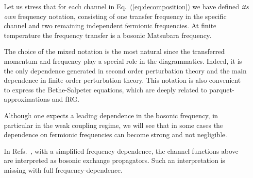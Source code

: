 Let us stress that for each channel in Eq.~(\ref{eq:decomposition}) we have defined \textit{its own} frequency notation, consisting of one transfer frequency in the specific channel 
and two remaining independent fermionic frequencies. 
 At finite temperature the frequency transfer is a bosonic Matsubara frequency.
 
 The choice of the mixed notation is the most natural\cite{Wentzell2017} since the transferred momentum and 
frequency play a special role in the diagrammatics.
Indeed, it is the only dependence generated in second order perturbation theory and the main dependence in finite 
order perturbation theory. This notation is also convenient to express the Bethe-Salpeter equations\cite{Rohringer2012}, which are deeply related to parquet-approximations and fRG.

Although one expects a leading dependence in the bosonic frequency, 
in particular in the weak coupling regime, we will see that in some cases the dependence on fermionic frequencies can become strong and not negligible.

In Refs.~, with a simplified frequency dependence, the channel functions above are interpreted as bosonic exchange propagators. Such an interpretation is missing with full frequency-dependence.

